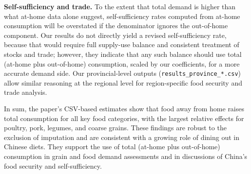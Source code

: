 \textbf{Self-sufficiency and trade.} To the extent that total demand is higher than what at-home data alone suggest, self-sufficiency rates computed from at-home consumption will be overstated if the denominator ignores the out-of-home component. Our results do not directly yield a revised self-sufficiency rate, because that would require full supply-use balance and consistent treatment of stocks and trade; however, they indicate that any such balance should use total (at-home plus out-of-home) consumption, scaled by our coefficients, for a more accurate demand side. Our provincial-level outputs (\texttt{results\_province\_*.csv}) allow similar reasoning at the regional level for region-specific food security and trade analysis.

In sum, the paper's CSV-based estimates show that food away from home raises total consumption for all key food categories, with the largest relative effects for poultry, pork, legumes, and coarse grains. These findings are robust to the exclusion of imputation and are consistent with a growing role of dining out in Chinese diets. They support the use of total (at-home plus out-of-home) consumption in grain and food demand assessments and in discussions of China's food security and self-sufficiency.
